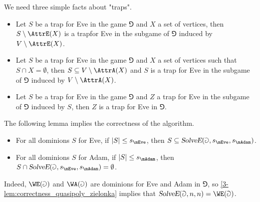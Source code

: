 We need three simple facts about "traps".

\begin{fact}\label{3-fact:traps}\hfill
\begin{itemize}
	\item Let $S$ be a trap for Eve in the game $\Game$ and $X$ a set of vertices, 
	then $S \setminus \AttrE(X)$ is a trapfor Eve in the subgame of $\Game$ induced by $V \setminus \AttrE(X)$.
	\item Let $S$ be a trap for Eve in the game $\Game$ and $X$ a set of vertices such that $S \cap X = \emptyset$, 
	then $S \subseteq V \setminus \AttrA(X)$ and $S$ is a trap for Eve in the subgame of $\Game$ induced by $V \setminus \AttrA(X)$.
	\item Let $S$ be a trap for Eve in the game $\Game$ and $Z$ a trap for Eve in the subgame of $\Game$ induced by $S$,
	then $Z$ is a trap for Eve in $\Game$.
\end{itemize}
\end{fact}

The following lemma implies the correctness of the algorithm.

\begin{lemma}\label{3-lem:correctness_quasipoly_zielonka}\hfill
\begin{itemize}
	\item For all dominions $S$ for Eve, if $|S| \le s_{\mEve}$, then $S \subseteq \textsl{SolveE}(\Game,s_{\mEve},s_{\mAdam})$.
	\item For all dominions $S$ for Adam, if $|S| \le s_{\mAdam}$, then $S \cap \textsl{SolveE}(\Game,s_{\mEve},s_{\mAdam}) = \emptyset$.
\end{itemize}
\end{lemma}

Indeed, $\WE(\Game)$ and $\WA(\Game)$ are dominions for Eve and Adam in $\Game$, 
so \cref{3-lem:correctness_quasipoly_zielonka} implies that $\textsl{SolveE}(\Game,n,n) = \WE(\Game)$.

